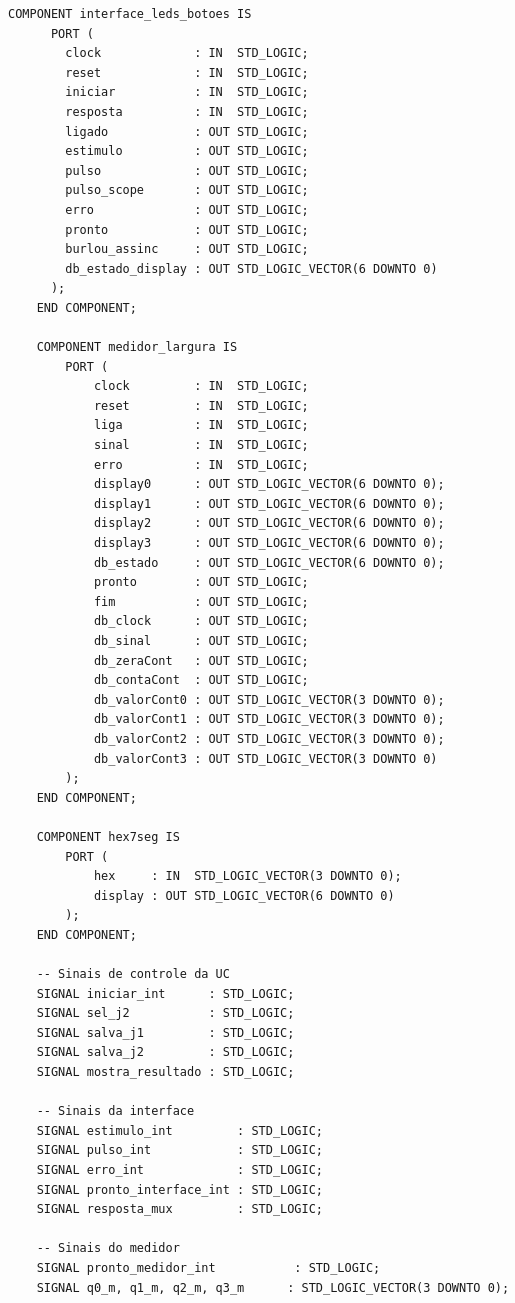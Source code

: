 \documentclass[12pt,a4paper]{article}
\begin{document}
\begin{lstlisting}[caption={Top-Level -- \texttt{jogo\_tempo\_reacao.vhd}},
                   label={lst:top}]
    COMPONENT interface_leds_botoes IS
      PORT (
        clock             : IN  STD_LOGIC;
        reset             : IN  STD_LOGIC;
        iniciar           : IN  STD_LOGIC;
        resposta          : IN  STD_LOGIC;
        ligado            : OUT STD_LOGIC;
        estimulo          : OUT STD_LOGIC;
        pulso             : OUT STD_LOGIC;
        pulso_scope       : OUT STD_LOGIC;
        erro              : OUT STD_LOGIC;
        pronto            : OUT STD_LOGIC;
        burlou_assinc     : OUT STD_LOGIC;
        db_estado_display : OUT STD_LOGIC_VECTOR(6 DOWNTO 0)
      );
    END COMPONENT;

    COMPONENT medidor_largura IS
        PORT (
            clock         : IN  STD_LOGIC;
            reset         : IN  STD_LOGIC;
            liga          : IN  STD_LOGIC;
            sinal         : IN  STD_LOGIC;
            erro          : IN  STD_LOGIC;
            display0      : OUT STD_LOGIC_VECTOR(6 DOWNTO 0);
            display1      : OUT STD_LOGIC_VECTOR(6 DOWNTO 0);
            display2      : OUT STD_LOGIC_VECTOR(6 DOWNTO 0);
            display3      : OUT STD_LOGIC_VECTOR(6 DOWNTO 0);
            db_estado     : OUT STD_LOGIC_VECTOR(6 DOWNTO 0);
            pronto        : OUT STD_LOGIC;
            fim           : OUT STD_LOGIC;
            db_clock      : OUT STD_LOGIC;
            db_sinal      : OUT STD_LOGIC;
            db_zeraCont   : OUT STD_LOGIC;
            db_contaCont  : OUT STD_LOGIC;
            db_valorCont0 : OUT STD_LOGIC_VECTOR(3 DOWNTO 0);
            db_valorCont1 : OUT STD_LOGIC_VECTOR(3 DOWNTO 0);
            db_valorCont2 : OUT STD_LOGIC_VECTOR(3 DOWNTO 0);
            db_valorCont3 : OUT STD_LOGIC_VECTOR(3 DOWNTO 0)
        );
    END COMPONENT;

    COMPONENT hex7seg IS
        PORT (
            hex     : IN  STD_LOGIC_VECTOR(3 DOWNTO 0);
            display : OUT STD_LOGIC_VECTOR(6 DOWNTO 0)
        );
    END COMPONENT;

    -- Sinais de controle da UC
    SIGNAL iniciar_int      : STD_LOGIC;
    SIGNAL sel_j2           : STD_LOGIC;
    SIGNAL salva_j1         : STD_LOGIC;
    SIGNAL salva_j2         : STD_LOGIC;
    SIGNAL mostra_resultado : STD_LOGIC;

    -- Sinais da interface
    SIGNAL estimulo_int         : STD_LOGIC;
    SIGNAL pulso_int            : STD_LOGIC;
    SIGNAL erro_int             : STD_LOGIC;
    SIGNAL pronto_interface_int : STD_LOGIC;
    SIGNAL resposta_mux         : STD_LOGIC;

    -- Sinais do medidor
    SIGNAL pronto_medidor_int           : STD_LOGIC;
    SIGNAL q0_m, q1_m, q2_m, q3_m      : STD_LOGIC_VECTOR(3 DOWNTO 0);


\end{lstlisting}
\end{document}
